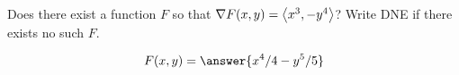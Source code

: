 \documentclass{ximera}
\author{David Guichard \and Neal Koblitz \and H. Jerome Keisler \and Albert Scheller \and Barry Balof \and Mike Wills \and Matthew Carr}
\begin{document}
\begin{exercise}




Does there exist a function $F$ so that $\nabla F(x,y)=\left\langle x^3,-y^4\right\rangle$? Write DNE if there exists no such $F$. 

\begin{prompt}
\[
F(x,y)=\answer{x^4/4-y^5/5}
\]
\end{prompt}



\end{exercise}
\end{document}
